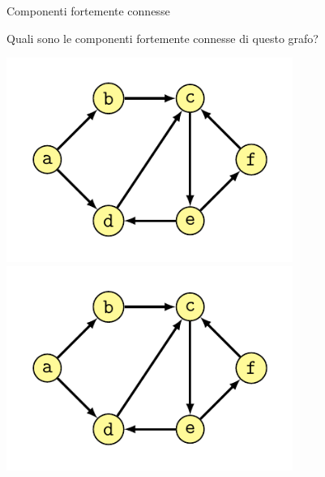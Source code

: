 \begin{frame}{Componenti fortemente connesse}

\vspace{-9pt}
\begin{myboxtitle}[Domanda]
Quali sono le componenti fortemente connesse di questo grafo?
\end{myboxtitle}


\begin{overprint}
\centering\includegraphics[width=0.70\textwidth,page=1]{scc.pdf}
\centering\includegraphics[width=0.70\textwidth,page=2]{scc.pdf}
\end{overprint}

\end{frame}

